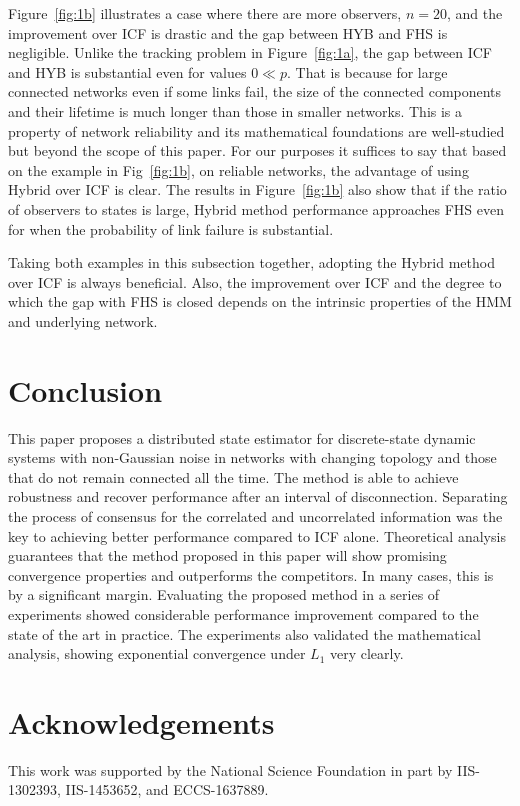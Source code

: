 \documentclass[journal]{IEEEtran}
\theoremstyle{remark}
\theoremstyle{definition}
\begin{document}
Figure~\ref{fig:1b} illustrates a case where 
there are more observers, $n= 20$, and the
improvement over ICF is drastic
and the gap between HYB and FHS is negligible.  Unlike the tracking problem in
Figure~\ref{fig:1a}, the gap between ICF and HYB is substantial even for values $0 \ll
p$.  That is because for large
connected networks even if some links fail, the size of the connected
components and their lifetime is much longer than those in smaller networks.
This is a property of network reliability and its mathematical foundations
are well-studied but beyond the scope of this paper. For our purposes
it suffices to say that based on the example in  Fig~\ref{fig:1b},  on
reliable networks, the advantage of using Hybrid over ICF is clear.
The results in Figure~\ref{fig:1b} also show that if the ratio of observers to
states is large, Hybrid method performance approaches FHS even
for when the probability of link failure is substantial.

Taking both examples in this subsection together, adopting the Hybrid method
over ICF is always beneficial. Also, the improvement over ICF and the degree to
which the gap with FHS is closed depends on the intrinsic properties of the HMM
and underlying network. 


\section{Conclusion} \label{sec:conclusion}

This paper proposes a distributed state estimator for discrete-state dynamic
systems with non-Gaussian noise in networks with changing topology and those
that do not remain connected all the time.  The method is able to achieve
robustness and recover performance after an interval of disconnection.
Separating the process of consensus for the correlated and uncorrelated
information was the key to achieving better performance compared to ICF alone.
Theoretical analysis guarantees that the method proposed in this paper will
show promising convergence properties and outperforms the competitors.  In many
cases, this is by a significant margin.  Evaluating the proposed method in a
series of experiments showed considerable performance improvement compared to
the state of the art in practice.  The experiments also validated the
mathematical analysis, showing exponential convergence under $L_1$ very clearly.

\section*{Acknowledgements}

This work was supported by the National Science Foundation 
in part by IIS-1302393, IIS-1453652, and ECCS-1637889.

\end{document}
